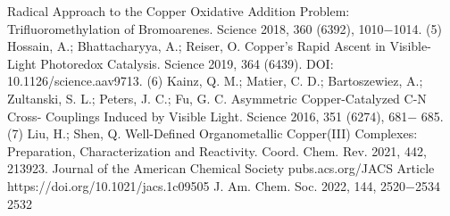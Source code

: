 \documentclass{article}
\begin{document}
Radical Approach to the Copper Oxidative Addition Problem:
Trifluoromethylation of Bromoarenes. Science 2018, 360 (6392),
1010−1014.
(5) Hossain, A.; Bhattacharyya, A.; Reiser, O. Copper’s Rapid Ascent
in Visible-Light Photoredox Catalysis. Science 2019, 364 (6439).
DOI: 10.1126/science.aav9713.
(6) Kainz, Q. M.; Matier, C. D.; Bartoszewiez, A.; Zultanski, S. L.;
Peters, J. C.; Fu, G. C. Asymmetric Copper-Catalyzed C-N Cross-
Couplings Induced by Visible Light. Science 2016, 351 (6274), 681−
685.
(7) Liu, H.; Shen, Q. Well-Defined Organometallic Copper(III)
Complexes: Preparation, Characterization and Reactivity. Coord.
Chem. Rev. 2021, 442, 213923.
Journal of the American Chemical Society
pubs.acs.org/JACS
Article
https://doi.org/10.1021/jacs.1c09505
J. Am. Chem. Soc. 2022, 144, 2520−2534
2532

\newpage

\end{document}
